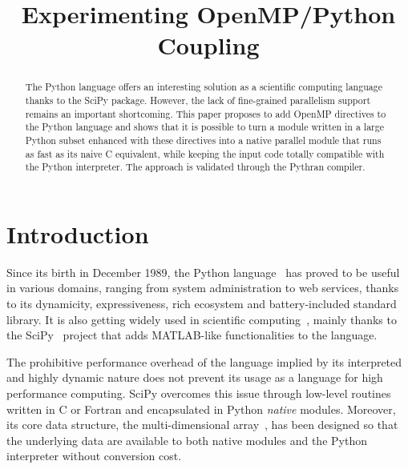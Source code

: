 \documentclass{sigplanconf}
\begin{document}
\renewcommand{\thelstlisting}{\arabic{lstlisting}}
%
\title{Experimenting OpenMP/Python Coupling}


\maketitle

%
\begin{abstract}

    The Python language offers an interesting solution as a scientific
    computing language thanks to the SciPy package. However, the lack of
    fine-grained parallelism support remains an important shortcoming. This
    paper proposes to add OpenMP directives to the Python language and shows
    that it is possible to turn a module written in a large Python subset
    enhanced with these directives into a native parallel module that runs as
    fast as its naive C equivalent, while keeping the input code totally
    compatible with the Python interpreter. The approach is validated through
    the Pythran compiler.

\end{abstract}

%
\section{Introduction}

Since its birth in December 1989, the Python language~\cite{rossum97} has proved
to be useful in various domains, ranging from system administration to web
services, thanks to its dynamicity, expressiveness, rich ecosystem and
battery-included standard library. It is also getting widely used in scientific
computing~\cite{Oliphant2007}, mainly thanks to the SciPy~\cite{scipy} project
that adds MATLAB-like functionalities to the language.

The prohibitive performance overhead of the language implied by its interpreted
and highly dynamic nature does not prevent its usage as a language for high
performance computing. SciPy overcomes this issue through low-level routines
written in C or Fortran and encapsulated in Python \emph{native} modules.
Moreover, its core data structure, the multi-dimensional
array~\cite{numpyarray2011}, has been designed so that the underlying data are
available to both native modules and the Python interpreter without conversion
cost.
\end{document}
